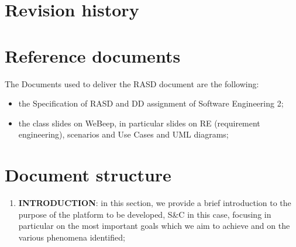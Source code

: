 	\section{Revision history}
	\section{Reference documents}
		The Documents used to deliver the RASD document are the following:
		\begin{itemize}
			\item the Specification of RASD and DD assignment of Software Engineering 2;
			\item the class slides on WeBeep, in particular slides on RE (requirement engineering), scenarios and Use Cases and UML diagrams;
		\end{itemize}
	\section{Document structure}
		\begin{enumerate}
			\item \textbf{INTRODUCTION}: in this section, we provide a brief introduction to the purpose of the platform to be developed, S\&C in this case, focusing in particular on the most important goals which we aim to achieve and on the various phenomena identified;
		\end{enumerate}